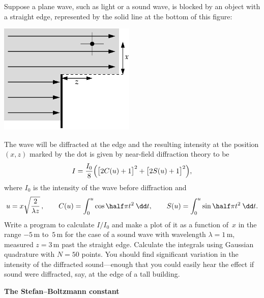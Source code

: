 \documentclass[12pt]{article}
\begin{document}
\begin{exercises}
\exercise Suppose a plane wave, such as light or a sound wave, is
blocked by an object with a straight edge, represented by the solid line at
the bottom of this figure:
\medskip
\begin{center}
\includegraphics[width=6.5cm]{edge.eps}
\end{center}
The wave will be diffracted at the edge and the resulting intensity at the
position $(x,z)$ marked by the dot is given by near-field diffraction
theory to be
\begin{displaymath}
I = \frac{I_0}{8} \Bigl( \bigl[ 2C(u) + 1 \bigr]^2 +
                        \bigl[ 2S(u) + 1 \bigr]^2 \Bigr),
\end{displaymath}
where $I_0$ is the intensity of the wave before diffraction and
\begin{displaymath}
u = x \sqrt{2\over\lambda z}\,, \qquad
C(u) = \int_0^u \cos \half\pi t^2 \>\dd t, \qquad
S(u) = \int_0^u \sin \half\pi t^2 \>\dd t.
\end{displaymath}
Write a program to calculate $I/I_0$ and make a plot of it as a function
of~$x$ in the range $-5\,$m to~$5\,$m for the case of a sound wave with
wavelength $\lambda=1\,$m, measured $z=3\,$m past the straight edge.
Calculate the integrals using Gaussian quadrature with $N=50$ points.  You
should find significant variation in the intensity of the diffracted
sound---enough that you could easily hear the effect if sound were
diffracted, say, at the edge of a tall building.



\exercise \textbf{The Stefan--Boltzmann constant}


\end{exercises}
\end{document}
